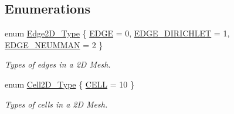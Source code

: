 \subsection*{Enumerations}
\begin{DoxyCompactItemize}
\item 
enum \hyperlink{namespaceFVL_abde0d02a32faee2d4b3e6c243d9d94cb}{Edge2D\_\-Type} \{ \hyperlink{namespaceFVL_abde0d02a32faee2d4b3e6c243d9d94cbaa622cbc12b78e3e883dd7b3217088a66}{EDGE} =  0, 
\hyperlink{namespaceFVL_abde0d02a32faee2d4b3e6c243d9d94cba2e0991fad8c36215c4677e86e00e071c}{EDGE\_\-DIRICHLET} =  1, 
\hyperlink{namespaceFVL_abde0d02a32faee2d4b3e6c243d9d94cbab37b73514a0194b0d535e7609c12b33b}{EDGE\_\-NEUMMAN} =  2
 \}
\begin{DoxyCompactList}\small\item\em Types of edges in a 2D Mesh. \item\end{DoxyCompactList}\item 
enum \hyperlink{namespaceFVL_aa77be52d0539533043f307505d0a8ec6}{Cell2D\_\-Type} \{ \hyperlink{namespaceFVL_aa77be52d0539533043f307505d0a8ec6a03be5fc53a9d77a64ff24f85a7784a7b}{CELL} =  10
 \}
\begin{DoxyCompactList}\small\item\em Types of cells in a 2D Mesh. \item\end{DoxyCompactList}\end{DoxyCompactItemize}
